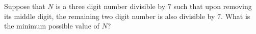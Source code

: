 Suppose that $N$ is a three digit number divisible by $7$ such that upon removing its middle digit, the remaining two digit number is also divisible by $7$. What is the minimum possible value of $N$?